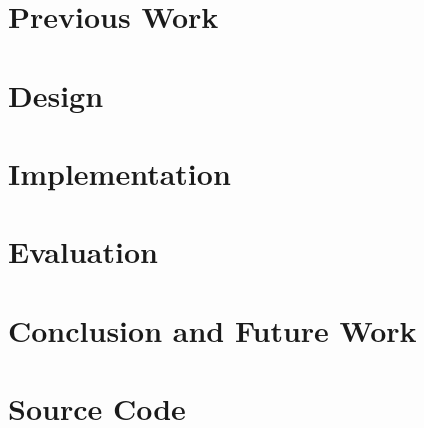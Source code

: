 \documentclass[MSc,12pt]{wsuthesis}
\begin{document}
\chapter{Previous Work} %

\chapter{Design}
 

\chapter{Implementation}

  
\chapter{Evaluation}


\chapter{Conclusion and Future Work}
\label{future-work-and-conclusions}




\newpage
\singlespacing



\appendix
\chapter{Source Code}

\end{document}
